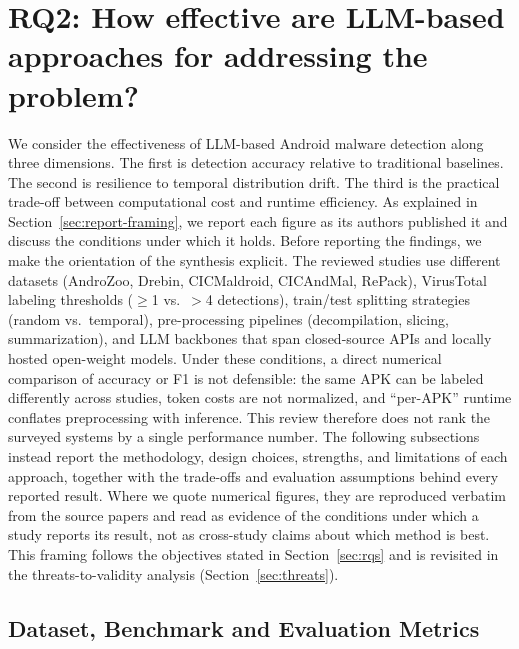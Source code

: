 \section{RQ2: How effective are LLM-based approaches for addressing the problem?}\label{sec:rq2}

We consider the effectiveness of LLM-based Android malware detection along three dimensions. The first is detection accuracy relative to traditional baselines. The second is resilience to temporal distribution drift. The third is the practical trade-off between computational cost and runtime efficiency. As explained in Section~\ref{sec:report-framing}, we report each figure as its authors published it and discuss the conditions under which it holds.
\label{sec:report-framing}
Before reporting the findings, we make the orientation of the synthesis explicit. The reviewed studies use different datasets (AndroZoo, Drebin, CICMaldroid, CICAndMal, RePack), VirusTotal labeling thresholds ($\geq$1 vs.\ $>$4 detections), train/test splitting strategies (random vs.\ temporal), pre-processing pipelines (decompilation, slicing, summarization), and LLM backbones that span closed-source APIs and locally hosted open-weight models. Under these conditions, a direct numerical comparison of accuracy or F1 is not defensible: the same APK can be labeled differently across studies, token costs are not normalized, and ``per-APK'' runtime conflates preprocessing with inference. This review therefore does not rank the surveyed systems by a single performance number. The following subsections instead report the methodology, design choices, strengths, and limitations of each approach, together with the trade-offs and evaluation assumptions behind every reported result. Where we quote numerical figures, they are reproduced verbatim from the source papers and read as evidence of the conditions under which a study reports its result, not as cross-study claims about which method is best. This framing follows the objectives stated in Section~\ref{sec:rqs} and is revisited in the threats-to-validity analysis (Section~\ref{sec:threats}).

\subsection{Dataset, Benchmark and Evaluation Metrics}

